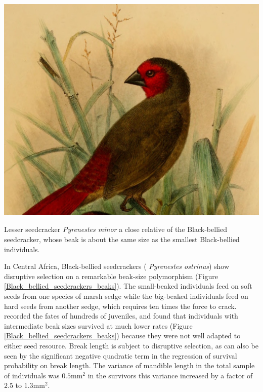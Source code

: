 
\begin{marginfigure}
\begin{center}
\includegraphics[width= \textwidth]{illustration_images/Quant_gen/Pyrenestes_seedcracker/Pyrenestes_minor.jpg}
\end{center}
\caption{Lesser seedcracker {\it Pyrenestes minor} a close relative of
  the Black-bellied seedcracker, whose beak is about the same size as
  the smallest Black-bellied individuals.  }  
\end{marginfigure}
In Central Africa, Black-bellied seedcrackers ({\it
  Pyrenestes ostrinus}) show disruptive selection on a remarkable beak-size polymorphism (Figure \ref{Black_bellied_seedcrackers_beaks}).  The small-beaked individuals feed on
soft  seeds from one species of marsh sedge while the big-beaked
individuals feed on hard seeds from another sedge, which
requires ten times the force to crack. \citet{smith1993disruptive}
recorded the fates of hundreds of juveniles, and found that
individuals with intermediate beak sizes survived at much lower rates
(Figure \ref{Black_bellied_seedcrackers_beaks}) because they were not
well adapted to either seed resource.  Break length is subject to
disruptive selection, as can also be seen by the significant negative quadratic
term in the regression of survival probability on break length. The
variance of mandible length in the total sample of individuals was
$0.5$mm$^2$ in the survivors this variance increased by a factor of $2.5$ to $1.3$mm$^2$.  

